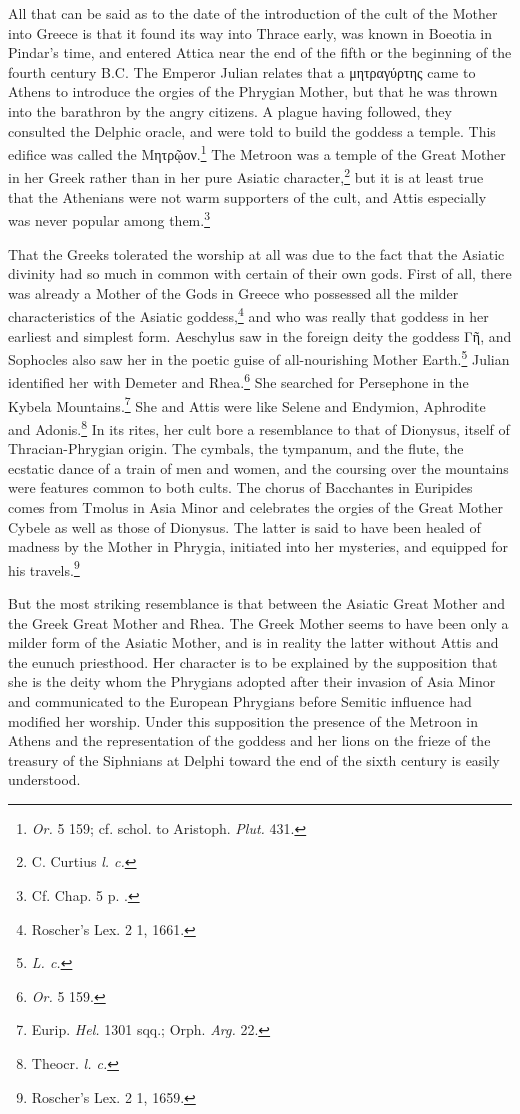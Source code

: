\documentclass[a4paper, 11pt, oneside, polutonikogreek, english]{article}
\begin{document}
All that can be said as to the date of the introduction of the cult of the Mother into Greece is that it found its way into Thrace early, was known in Boeotia in Pindar's time, and entered Attica near the end of the fifth or the beginning of the fourth century \textsc{B.C.} The Emperor Julian relates that a μητραγύρτης came to Athens to introduce the orgies of the Phrygian Mother, but that he was thrown into the barathron by the angry citizens. A plague having followed, they consulted the Delphic oracle, and were told to build the goddess a temple. This edifice was called the Μητρῷον.\footnote{\emph{Or.} 5 159; cf. schol. to Aristoph. \emph{Plut.} 431.} The Metroon was a temple of the Great Mother in her Greek rather than in her pure Asiatic character,\footnote{C. Curtius \emph{l. c.}} but it is at least true that the Athenians were not warm supporters of the cult, and Attis especially was never popular among them.\footnote{Cf. Chap. 5 p. .}

That the Greeks tolerated the worship at all was due to the fact that the Asiatic divinity had so much in common with certain of their own gods. First of all, there was already a Mother of the Gods in Greece who possessed all the milder characteristics of the Asiatic goddess,\footnote{Roscher's Lex. 2 1, 1661.} and who was really that goddess in her earliest and simplest form. Aeschylus saw in the foreign deity the goddess Γῆ, and Sophocles also saw her in the poetic guise of all-nourishing Mother Earth.\footnote{\emph{L. c.}} Julian identified her with Demeter and Rhea.\footnote{\emph{Or.} 5 159.} She searched for Persephone in the Kybela Mountains.\footnote{Eurip. \emph{Hel.} 1301 sqq.; Orph. \emph{Arg.} 22.} She and Attis were like Selene and Endymion, Aphrodite and Adonis.\footnote{Theocr. \emph{l. c.}} In its rites, her cult bore a resemblance to that of Dionysus, itself of Thracian-Phrygian origin. The cymbals, the tympanum, and the flute, the ecstatic dance of a train of men and women, and the coursing over the mountains were features common to both cults. The chorus of Bacchantes in Euripides comes from Tmolus in Asia Minor and celebrates the orgies of the Great Mother Cybele as well as those of Dionysus. The latter is said to have been healed of madness by the Mother in Phrygia, initiated into her mysteries, and equipped for his travels.\footnote{Roscher's Lex. 2 1, 1659.}

But the most striking resemblance is that between the Asiatic Great Mother and the Greek Great Mother and Rhea. The Greek Mother seems to have been only a milder form of the Asiatic Mother, and is in reality the latter without Attis and the eunuch priesthood. Her character is to be explained by the supposition that she is the deity whom the Phrygians adopted after their invasion of Asia Minor and communicated to the European Phrygians before Semitic influence had modified her worship. Under this supposition the presence of the Metroon in Athens and the representation of the goddess and her lions on the frieze of the treasury of the Siphnians at Delphi toward the end of the sixth century is easily understood.
\end{document}
